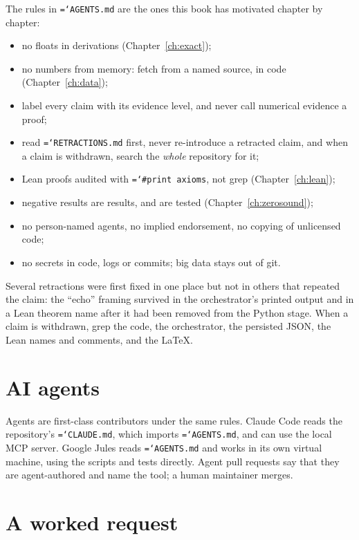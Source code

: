 \documentclass[11pt,a4paper,openany]{book}
\newcommand{\code}[1]{\texttt{\hyphenchar\font=`\-\relax #1}}
\theoremstyle{definition}
\theoremstyle{plain}
\begin{document}
The rules in \code{AGENTS.md} are the ones this book has motivated chapter by chapter:
\begin{itemize}
  \item no floats in derivations (Chapter~\ref{ch:exact});
  \item no numbers from memory: fetch from a named source, in code (Chapter~\ref{ch:data});
  \item label every claim with its evidence level, and never call numerical evidence a proof;
  \item read \code{RETRACTIONS.md} first, never re-introduce a retracted claim, and when a claim is
        withdrawn, search the \emph{whole} repository for it;
  \item Lean proofs audited with \code{\#print axioms}, not grep (Chapter~\ref{ch:lean});
  \item negative results are results, and are tested (Chapter~\ref{ch:zerosound});
  \item no person-named agents, no implied endorsement, no copying of unlicensed code;
  \item no secrets in code, logs or commits; big data stays out of git.
\end{itemize}

\begin{lesson}
Several retractions were first fixed in one place but not in others that repeated the claim: the
``echo'' framing survived in the orchestrator's printed output and in a Lean theorem name after it
had been removed from the Python stage. When a claim is withdrawn, grep the code, the
orchestrator, the persisted JSON, the Lean names and comments, and the LaTeX.
\end{lesson}

\section{AI agents}

Agents are first-class contributors under the same rules. Claude Code reads the repository's
\code{CLAUDE.md}, which imports \code{AGENTS.md}, and can use the local MCP server. Google Jules
reads \code{AGENTS.md} and works in its own virtual machine, using the scripts and tests directly.
Agent pull requests say that they are agent-authored and name the tool; a human maintainer merges.

\section{A worked request}
\end{document}
